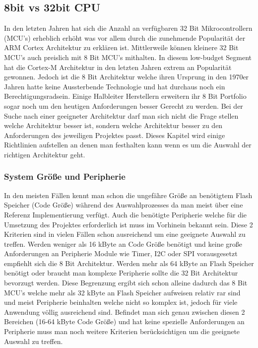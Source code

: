 \documentclass[MES,Master,ngerman]{twbook}%
\begin{document}
\subsection{8bit vs 32bit CPU}
In den letzten Jahren hat sich die Anzahl an verfügbaren 32 Bit Mikrocontrollern (MCU's) erheblich erhöht was vor allem durch die zunehmende Popularität der ARM Cortex Architektur zu erklären ist. Mittlerweile können kleinere 32 Bit MCU's auch preislich mit 8 Bit MCU's mithalten. In diesem low-budget Segment hat die Cortex-M Architektur in den letzten Jahren extrem an Popularität gewonnen. Jedoch ist die 8 Bit Architektur welche ihren Ursprung in den 1970er Jahren hatte keine Aussterbende Technologie und hat durchaus noch ein Berechtigungsradsein. Einige Halbleiter Herstellern erweitern ihr 8 Bit Portfolio sogar noch um den heutigen Anforderungen besser Gerecht zu werden. Bei der Suche nach einer geeigneter Architektur darf man sich nicht die Frage stellen welche Architektur besser ist, sondern welche Architektur besser zu den Anforderungen des jeweiligen Projektes passt. Dieses Kapitel wird einige Richtlinien aufstellen an denen man festhalten kann wenn es um die Auswahl der richtigen Architektur geht.

\subsubsection{System Größe und Peripherie}
In den meisten Fällen kennt man schon die ungefähre Größe an benötigtem Flash Speicher (Code Größe) während des Auswahlprozesses da man meist über eine Referenz Implementierung verfügt. Auch die benötigte Peripherie welche für die Umsetzung des Projektes erforderlich ist muss im Vorhinein bekannt sein. Diese 2 Kriterien sind in vielen Fällen schon ausreichend um eine geeignete Auswahl zu treffen. Werden weniger als 16 kByte an Code Größe benötigt und keine große Anforderungen an Peripherie Module wie Timer, I2C oder SPI vorausgesetzt empfiehlt sich die 8 Bit Architektur. Werden mehr als 64 kByte an Flash Speicher benötigt oder braucht man komplexe Peripherie sollte die 32 Bit Architektur bevorzugt werden. Diese Begrenzung ergibt sich schon alleine dadurch das 8 Bit MCU's welche mehr als 32 kByte an Flash Speicher aufweisen relativ rar sind und meist Peripherie beinhalten welche nicht so komplex ist, jedoch für viele Anwendung völlig ausreichend sind. Befindet man sich genau zwischen diesen 2 Bereichen (16-64 kByte Code Größe) und hat keine spezielle Anforderungen an Peripherie muss man noch weitere Kriterien berücksichtigen um die geeignete Auswahl zu treffen.
\end{document}
